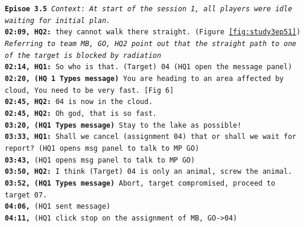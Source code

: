 \noindent\texttt{\textbf{Episoe 3.5}
\emph{Context: At start of the session 1, all players were idle waiting for initial plan.}\\
\textbf{02:09, HQ2:} they cannot walk there straight. (Figure \ref{fig:study3ep51})\\
\emph{Referring to team MB, GO, HQ2 point out that the straight path to one of the target is blocked by radiation}\\
\textbf{02:14, HQ1:} So who is that. (Target) 04 (HQ1 open the message panel) \\
\textbf{02:20, (HQ 1 Types message)}  You are heading to an area affected by cloud, You need to be very fast. [Fig 6] \\
\textbf{02:45, HQ2:} 04 is now in the cloud. \\
\textbf{02:45, HQ2:} Oh god, that is so fast.\\
\textbf{03:20, (HQ1 Types message)} Stay to the lake as possible!\\
\textbf{03:33, HQ1:} Shall we cancel (assignment 04) that or shall we wait for report? (HQ1 opens msg panel to talk to MP GO)\\
\textbf{03:43,} (HQ1 opens msg panel to talk to MP GO) \\
\textbf{03:50, HQ2:} I think (Target) 04 is only an animal, screw the animal.  \\
\textbf{03:52, (HQ1 Types message)} Abort, target compromised, proceed to target 07. \\
\textbf{04:06, } (HQ1 sent message)\\
\textbf{04:11, } (HQ1 click stop on the assignment of MB, GO->04)\\
}

